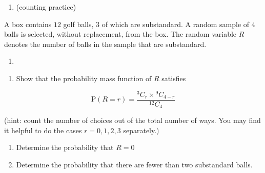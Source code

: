 \documentclass[
]{book}
\providecommand{\tightlist}{%
  \setlength{\itemsep}{0pt}\setlength{\parskip}{0pt}}
\theoremstyle{definition}
\theoremstyle{definition}
\theoremstyle{definition}
\theoremstyle{definition}
\theoremstyle{remark}
\begin{document}
\begin{enumerate}
\def\labelenumi{\arabic{enumi}.}
\setcounter{enumi}{2}
\tightlist
\item
  (counting practice)
\end{enumerate}

A box contains \(12\) golf balls, \(3\) of which are substandard. A random sample of \(4\) balls is selected, without replacement, from the box. The random variable \(R\) denotes the number of balls in the sample that are substandard.

\begin{enumerate}
\def\labelenumi{\alph{enumi})}
\item
\end{enumerate}

\begin{enumerate}
\def\labelenumi{(\roman{enumi})}
\tightlist
\item
  Show that the probability mass function of \(R\) satisfies
\end{enumerate}

\[\text{P}(R=r) = \frac{{}^3C_r \times {}^9C_{4-r}}{^{12}C_{4}}\]

(hint: count the number of choices out of the total number of ways. You may find it helpful to do the cases \(r=0,1,2,3\) separately.)

\begin{enumerate}
\def\labelenumi{(\roman{enumi})}
\setcounter{enumi}{1}
\item
  Determine the probability that \(R=0\)
\item
  Determine the probability that there are fewer than two substandard balls.
\end{enumerate}

  
\end{document}
